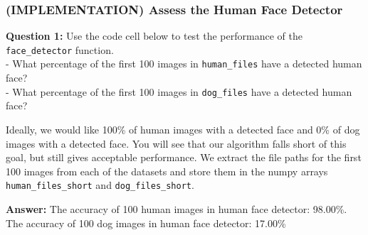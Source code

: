 \documentclass[11pt]{article}
\begin{document}
    \hypertarget{implementation-assess-the-human-face-detector}{%
\subsubsection{(IMPLEMENTATION) Assess the Human Face
Detector}\label{implementation-assess-the-human-face-detector}}

\textbf{Question 1:} Use the code cell below to test the performance of
the \texttt{face\_detector} function.\\
- What percentage of the first 100 images in \texttt{human\_files} have
a detected human face?\\
- What percentage of the first 100 images in \texttt{dog\_files} have a
detected human face?

Ideally, we would like 100\% of human images with a detected face and
0\% of dog images with a detected face. You will see that our algorithm
falls short of this goal, but still gives acceptable performance. We
extract the file paths for the first 100 images from each of the
datasets and store them in the numpy arrays \texttt{human\_files\_short}
and \texttt{dog\_files\_short}.

    \textbf{Answer:} The accuracy of 100 human images in human face
detector: 98.00\%. The accuracy of 100 dog images in human face
detector: 17.00\%
\end{document}
